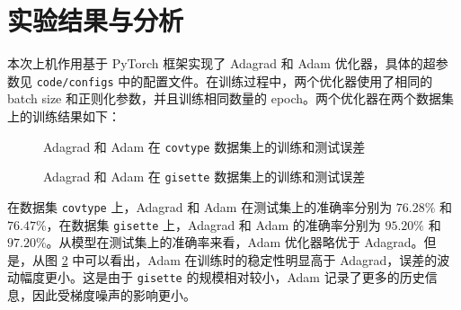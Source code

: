\documentclass{article}
\begin{document}
\section{实验结果与分析}

本次上机作用基于 PyTorch 框架实现了 Adagrad 和 Adam 优化器，具体的超参数见 \texttt{code/configs} 中的配置文件。在训练过程中，两个优化器使用了相同的 batch size 和正则化参数，并且训练相同数量的 epoch。两个优化器在两个数据集上的训练结果如下：

\begin{figure}[h]
    \centering
    \caption{Adagrad 和 Adam 在 \texttt{covtype} 数据集上的训练和测试误差}
    \label{fig:covtype_results}
\end{figure}

\begin{figure}[h]
    \centering
    \caption{Adagrad 和 Adam 在 \texttt{gisette} 数据集上的训练和测试误差}
    \label{fig:gisette_results}
\end{figure}

在数据集 \texttt{covtype} 上，Adagrad 和 Adam 在测试集上的准确率分别为 $76.28\%$ 和 $76.47\%$，在数据集 \texttt{gisette} 上，Adagrad 和 Adam 的准确率分别为 $95.20\%$ 和 $97.20\%$。从模型在测试集上的准确率来看，Adam 优化器略优于 Adagrad。但是，从图 \ref{fig:gisette_results} 中可以看出，Adam 在训练时的稳定性明显高于 Adagrad，误差的波动幅度更小。这是由于 \texttt{gisette} 的规模相对较小，Adam 记录了更多的历史信息，因此受梯度噪声的影响更小。
\end{document}
